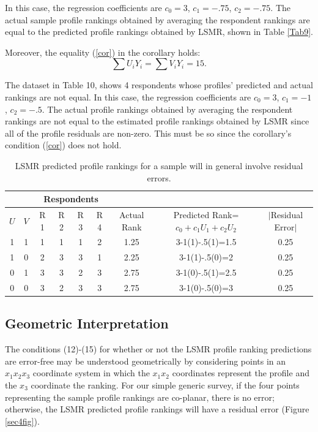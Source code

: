 \documentclass[a4paper, 12pt]{article}
\begin{document}
{\flushleft In} this case, the regression coefficients are
$c_0=3$, $c_1=-.75$, $c_2=-.75$.  The actual sample profile rankings obtained by averaging the respondent rankings are equal to the predicted profile rankings obtained by LSMR, shown in Table \ref{Tab9}.

{\flushleft Moreover}, the equality (\ref{cor}) in the corollary holds:
$$\sum U_iY_i=\sum V_iY_i = 15.$$

The dataset in Table 10, shows 4 respondents whose profiles' predicted and actual rankings are not equal.  In this case, the regression coefficients are
$c_0=3$, $c_1=-1$, $c_2=-.5$. The actual profile rankings obtained by averaging the respondent rankings are not equal to the estimated profile rankings obtained by LSMR since all of the profile residuals are non-zero. This must be so since the corollary's condition (\ref{cor}) does not hold.
\begin{table}[!htpb]
	\centering
	\scriptsize
	\begin{tabular}{cc|cccc|c|c|c}
		\multicolumn{2}{c}{} &\multicolumn{4}{c}{Respondents}\\\hline
		$U$ & $V$ & R 1&  R 2& R 3& R 4 &Actual Rank&Predicted Rank=$c_0+c_1U_1+c_2U_2$ & $|$Residual Error$|$\\  \hline
		
		1 &1&1&1&1&2&1.25&3-1(1)-.5(1)=1.5&0.25\\
		1 &0&2&3&3&1&2.25&3-1(1)-.5(0)=2&0.25\\
		0 &1&3&3&2&3&2.75 &3-1(0)-.5(1)=2.5&0.25 \\
		0 &0&3&2&3&3&2.75 &3-1(0)-.5(0)=3&0.25 \\\hline
	\end{tabular}
	\caption{{\small LSMR predicted profile rankings for a sample will in general involve residual errors. }}
	\label{Tab10}
\end{table}

\subsection{Geometric Interpretation}

The conditions  (12)-(15) for whether or not the LSMR  profile ranking predictions are error-free may be understood geometrically by considering points in an $x_1x_2x_3$ coordinate system in which the $x_1x_2$ coordinates represent the profile and the $x_3$ coordinate the ranking. For our simple generic survey,  if the four points representing the sample profile rankings are co-planar, there is no error; otherwise, the LSMR predicted profile rankings will have a residual error (Figure  \ref{sec4fig}).
\end{document}
